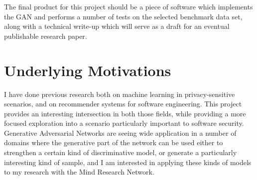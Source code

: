 \documentclass{article}
\begin{document}
The final product for this project should be a piece of software which implements the GAN and performs a number of tests on the selected benchmark data set, along with a technical write-up which will serve as a draft for an eventual publishable research paper. 

\section{Underlying Motivations}

I have done previous research both on machine learning in privacy-sensitive scenarios, and on recommender systems for software engineering. This project provides an interesting intersection in both those fields, while providing a more focused exploration into a scenario particularly important to software security. Generative Adversarial Networks are seeing wide application in a number of domains where the generative part of the network can be used either to strengthen a certain kind of discriminative model, or generate a particularly interesting kind of sample, and I am interested in applying these kinds of models to my research with the Mind Research Network.


\end{document}
